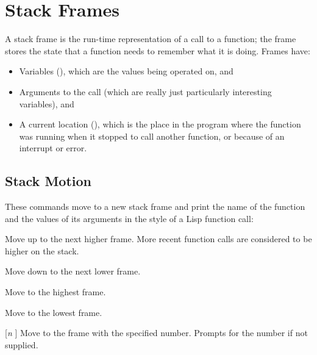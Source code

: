 \section{Stack Frames}
 

A stack frame is the run-time representation of a call to a function;
the frame stores the state that a function needs to remember what it is
doing.  Frames have:
\begin{itemize}

\item
Variables (), which are the values being operated
on, and

\item
Arguments to the call (which are really just particularly interesting
variables), and

\item
A current location (), which is the place in
the program where the function was running when it stopped to call another
function, or because of an interrupt or error.
\end{itemize}


\subsection{Stack Motion}

These commands move to a new stack frame and print the name of the function
and the values of its arguments in the style of a Lisp function call:
\begin{Lentry}

\item[\code{up}]
Move up to the next higher frame.  More recent function calls are considered
to be higher on the stack.

\item[\code{down}]
Move down to the next lower frame.

\item[\code{top}]
Move to the highest frame.

\item[\code{bottom}]
Move to the lowest frame.

\item[\code{frame} [\textit{n}]]
Move to the frame with the specified number.  Prompts for the number if not
supplied.

% 
% 
\end{Lentry}


